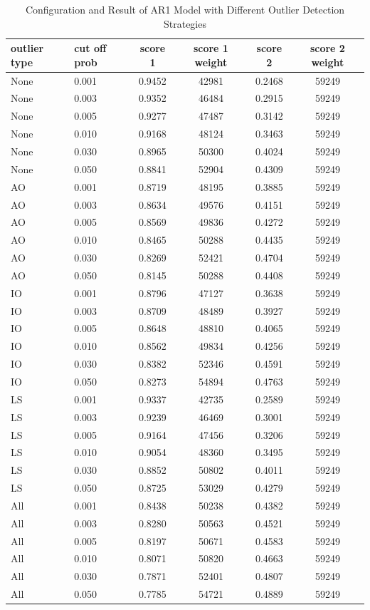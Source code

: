 \documentclass{article}
\begin{document}
\begin{longtable}[htbp]{l|l|*{4}{c}}
    \caption{Configuration and Result of AR1 Model with Different Outlier Detection Strategies}
    \label{tab:tab1.3.3}\\
    \textbf{outlier type} & \textbf{cut off prob} & \textbf{score 1} & \textbf{score 1 weight} & \textbf{score 2} & \textbf{score 2 weight} \\
    \hline
    None & 0.001 & 0.9452 & 42981 & 0.2468 & 59249\\
    None & 0.003 & 0.9352 & 46484 & 0.2915 & 59249\\
    None & 0.005 & 0.9277 & 47487 & 0.3142 & 59249\\
    None & 0.010 & 0.9168 & 48124 & 0.3463 & 59249\\
    None & 0.030 & 0.8965 & 50300 & 0.4024 & 59249\\
    None & 0.050 & 0.8841 & 52904 & 0.4309 & 59249\\
    AO & 0.001 & 0.8719 & 48195 & 0.3885 & 59249\\
    AO & 0.003 & 0.8634 & 49576 & 0.4151 & 59249\\
    AO & 0.005 & 0.8569 & 49836 & 0.4272 & 59249\\
    AO & 0.010 & 0.8465 & 50288 & 0.4435 & 59249\\
    AO & 0.030 & 0.8269 & 52421 & 0.4704 & 59249\\
    AO & 0.050 & 0.8145 & 50288 & 0.4408 & 59249\\
    IO & 0.001 & 0.8796 & 47127 & 0.3638 & 59249\\
    IO & 0.003 & 0.8709 & 48489 & 0.3927 & 59249\\
    IO & 0.005 & 0.8648 & 48810 & 0.4065 & 59249\\
    IO & 0.010 & 0.8562 & 49834 & 0.4256 & 59249\\
    IO & 0.030 & 0.8382 & 52346 & 0.4591 & 59249\\
    IO & 0.050 & 0.8273 & 54894 & 0.4763 & 59249\\
    LS & 0.001 & 0.9337 & 42735 & 0.2589 & 59249\\
    LS & 0.003 & 0.9239 & 46469 & 0.3001 & 59249\\
    LS & 0.005 & 0.9164 & 47456 & 0.3206 & 59249\\
    LS & 0.010 & 0.9054 & 48360 & 0.3495 & 59249\\
    LS & 0.030 & 0.8852 & 50802 & 0.4011 & 59249\\
    LS & 0.050 & 0.8725 & 53029 & 0.4279 & 59249\\
    All & 0.001 & 0.8438 & 50238 & 0.4382 & 59249\\
    All & 0.003 & 0.8280 & 50563 & 0.4521 & 59249\\
    All & 0.005 & 0.8197 & 50671 & 0.4583 & 59249\\
    All & 0.010 & 0.8071 & 50820 & 0.4663 & 59249\\
    All & 0.030 & 0.7871 & 52401 & 0.4807 & 59249\\
    All & 0.050 & 0.7785 & 54721 & 0.4889 & 59249\\
\end{longtable}
\end{document}
